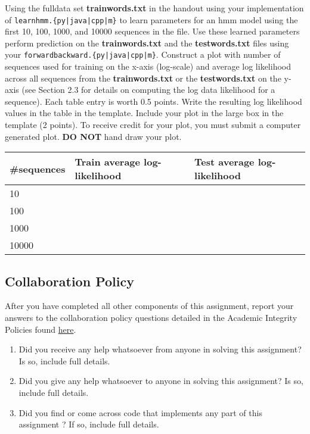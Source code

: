 \documentclass{article}
\begin{document}
Using the fulldata set \textbf{trainwords.txt} in the handout using your implementation of \texttt{learnhmm.\{py|java|cpp|m\}} to learn parameters for an hmm model using the first 10, 100, 1000, and 10000 sequences in the file.
Use these learned parameters perform prediction on the \textbf{trainwords.txt} and the \textbf{testwords.txt} files using your \texttt{forwardbackward.\{py|java|cpp|m\}}.
Construct a plot with number of sequences used for training on the x-axis (log-scale) and average log likelihood across all sequences from the \textbf{trainwords.txt} or the \textbf{testwords.txt} on the y-axis (see Section 2.3 for details on computing the log data likelihood for a sequence). Each table entry is worth 0.5 points. 
Write the resulting log likelihood values in the table in the template.
Include your plot in the large box in the template (2 points).
To receive credit for your plot, you must submit a computer generated plot.
\textbf{DO NOT} hand draw your plot.

\begin{table}[h]
    \center
    \begin{tabular}{|m{2cm}|m{3cm}|m{3cm}|}
    \hline
    \#sequences & Train average log-likelihood & Test average log-likelihood \\ \hline
    10         &    &  \\ \hline
    100        &    &  \\ \hline
    1000       &    &  \\ \hline
    10000      &    &  \\ \hline
    \end{tabular}
    \end{table}

 \begin{tcolorbox}[fit,height=13cm, width=17cm, blank, borderline={1pt}{-2pt}]
 \end{tcolorbox}


\subsection{Collaboration Policy}
After you have completed all other components of this assignment, report your answers to the collaboration policy questions detailed in the Academic Integrity Policies found \href{http://www.cs.cmu.edu/~mgormley/courses/10601bd-f18/about.html#7-academic-integrity-policies}{here}.
    \begin{enumerate}
        \item Did you receive any help whatsoever from anyone in solving this assignment? Is so, include full details.
        \item Did you give any help whatsoever to anyone in solving this assignment? Is so, include full details.
        \item Did you find or come across code that implements any part of this assignment ? If so, include full details.
    \end{enumerate}

\begin{tcolorbox}[fit,height=10cm, width=17cm, blank, borderline={1pt}{-2pt}]
    \end{tcolorbox}

\clearpage
\end{document}
